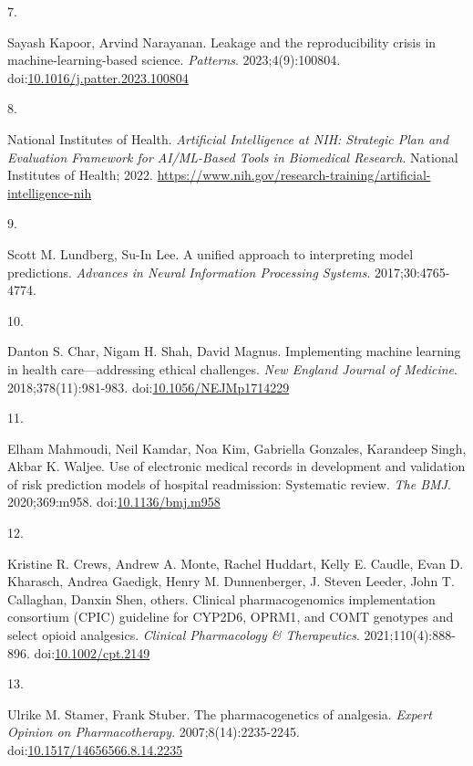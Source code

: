 \documentclass[
  12pt,
]{book}
\newlength{\cslhangindent}
\newlength{\csllabelwidth}
\newenvironment{CSLReferences}[2] %
 {\begin{list}{}{%
  \setlength{\itemindent}{0pt}
  \setlength{\leftmargin}{0pt}
  \setlength{\parsep}{0pt}
  \ifodd #1
   \setlength{\leftmargin}{\cslhangindent}
   \setlength{\itemindent}{-1\cslhangindent}
  \fi
  \setlength{\itemsep}{#2\baselineskip}}}
 {\end{list}}
\newcommand{\CSLLeftMargin}[1]{\parbox[t]{\csllabelwidth}{\strut#1\strut}}
\newcommand{\CSLRightInline}[1]{\parbox[t]{\linewidth - \csllabelwidth}{\strut#1\strut}}
\begin{document}
\begin{CSLReferences}{0}{1}
\CSLLeftMargin{7. }%
\CSLRightInline{Sayash Kapoor, Arvind Narayanan. Leakage and the
reproducibility crisis in machine-learning-based science.
\emph{Patterns}. 2023;4(9):100804.
doi:\href{https://doi.org/10.1016/j.patter.2023.100804}{10.1016/j.patter.2023.100804}}

\CSLLeftMargin{8. }%
\CSLRightInline{National Institutes of Health. \emph{Artificial
Intelligence at {NIH}: Strategic Plan and Evaluation Framework for
{AI/ML}-Based Tools in Biomedical Research}. National Institutes of
Health; 2022.
\url{https://www.nih.gov/research-training/artificial-intelligence-nih}}

\CSLLeftMargin{9. }%
\CSLRightInline{Scott M. Lundberg, Su-In Lee. A unified approach to
interpreting model predictions. \emph{Advances in Neural Information
Processing Systems}. 2017;30:4765-4774.}

\CSLLeftMargin{10. }%
\CSLRightInline{Danton S. Char, Nigam H. Shah, David Magnus.
Implementing machine learning in health care---addressing ethical
challenges. \emph{New England Journal of Medicine}.
2018;378(11):981-983.
doi:\href{https://doi.org/10.1056/NEJMp1714229}{10.1056/NEJMp1714229}}

\CSLLeftMargin{11. }%
\CSLRightInline{Elham Mahmoudi, Neil Kamdar, Noa Kim, Gabriella
Gonzales, Karandeep Singh, Akbar K. Waljee. Use of electronic medical
records in development and validation of risk prediction models of
hospital readmission: Systematic review. \emph{The BMJ}. 2020;369:m958.
doi:\href{https://doi.org/10.1136/bmj.m958}{10.1136/bmj.m958}}

\CSLLeftMargin{12. }%
\CSLRightInline{Kristine R. Crews, Andrew A. Monte, Rachel Huddart,
Kelly E. Caudle, Evan D. Kharasch, Andrea Gaedigk, Henry M.
Dunnenberger, J. Steven Leeder, John T. Callaghan, Danxin Shen, others.
Clinical pharmacogenomics implementation consortium ({CPIC}) guideline
for {CYP2D6}, {OPRM1}, and {COMT} genotypes and select opioid
analgesics. \emph{Clinical Pharmacology \& Therapeutics}.
2021;110(4):888-896.
doi:\href{https://doi.org/10.1002/cpt.2149}{10.1002/cpt.2149}}

\CSLLeftMargin{13. }%
\CSLRightInline{Ulrike M. Stamer, Frank Stuber. The pharmacogenetics of
analgesia. \emph{Expert Opinion on Pharmacotherapy}.
2007;8(14):2235-2245.
doi:\href{https://doi.org/10.1517/14656566.8.14.2235}{10.1517/14656566.8.14.2235}}


\end{CSLReferences}
\end{document}
